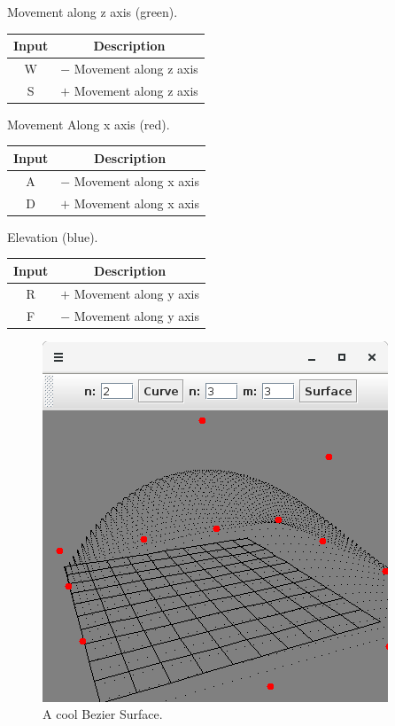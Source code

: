 \documentclass{article}
\begin{document}
Movement along z axis (green).

\begin{table}[ht!]
  \centering
  \begin{tabular}{||c c||}
    \hline
    Input & Description \\
    \hline
    \hline
    W & $-$ Movement along z axis  \\
    \hline
    S & $+$ Movement along z axis \\
    \hline
  \end{tabular}
\end{table}

Movement Along x axis (red). 

\begin{table}[ht!]
  \centering
  \begin{tabular}{||c c||}
    \hline
    Input & Description \\
    \hline
    \hline
    A &  $-$ Movement along x axis \\
    \hline
    D &  $+$ Movement along x axis \\
    \hline
  \end{tabular}
\end{table}

Elevation (blue).

\begin{table}[ht!]
  \centering
  \begin{tabular}{||c c||}
    \hline
    Input & Description \\
    \hline
    \hline
    R & $+$ Movement along y axis \\
    \hline
    F & $-$ Movement along y axis \\
    \hline
  \end{tabular}
\end{table}

\begin{figure}[!htb]
  \caption{A cool Bezier Surface.}
  \centering
  \includegraphics[scale=0.38]{images/image6.png}
\end{figure}
\end{document}

